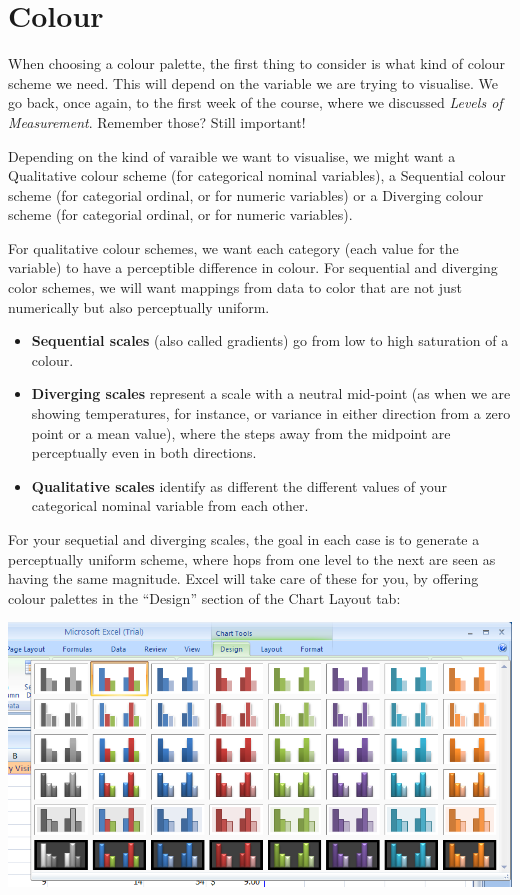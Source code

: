 \documentclass[
]{book}
\providecommand{\tightlist}{%
  \setlength{\itemsep}{0pt}\setlength{\parskip}{0pt}}
\begin{document}
\hypertarget{colour}{%
\section{Colour}\label{colour}}

When choosing a colour palette, the first thing to consider is what kind of colour scheme we need. This will depend on the variable we are trying to visualise. We go back, once again, to the first week of the course, where we discussed \emph{Levels of Measurement}. Remember those? Still important!

Depending on the kind of varaible we want to visualise, we might want a Qualitative colour scheme (for categorical nominal variables), a Sequential colour scheme (for categorial ordinal, or for numeric variables) or a Diverging colour scheme (for categorial ordinal, or for numeric variables).

For qualitative colour schemes, we want each category (each value for the variable) to have a perceptible difference in colour. For sequential and diverging color schemes, we will want mappings from data to color that are not just numerically but also perceptually uniform.

\begin{itemize}
\tightlist
\item
  \textbf{Sequential scales} (also called gradients) go from low to high saturation of a colour.
\item
  \textbf{Diverging scales} represent a scale with a neutral mid-point (as when we are showing temperatures, for instance, or variance in either direction from a zero point or a mean value), where the steps away from the midpoint are perceptually even in both directions.
\item
  \textbf{Qualitative scales} identify as different the different values of your categorical nominal variable from each other.
\end{itemize}

For your sequetial and diverging scales, the goal in each case is to generate a perceptually uniform scheme, where hops from one level to the next are seen as having the same magnitude. Excel will take care of these for you, by offering colour palettes in the ``Design'' section of the Chart Layout tab:

\includegraphics{imgs/chart_style.png}
\end{document}
